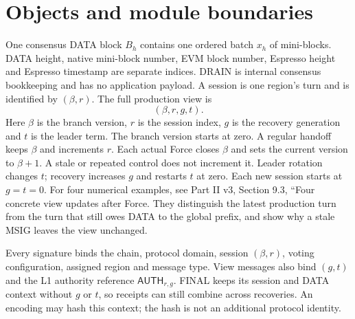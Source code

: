 \documentclass[11pt,a4paper]{article}
\newcommand{\api}[1]{\ensuremath{\mathsf{#1}}}
\begin{document}
\section{Objects and module boundaries}\label{sec:objects}
One consensus DATA block $B_h$ contains one ordered batch $x_h$ of
mini-blocks. DATA height, native mini-block number, EVM block number,
Espresso height and Espresso timestamp are separate indices. DRAIN is
internal consensus bookkeeping and has no application payload.
A session is one region's turn and is identified by $(\beta,r)$.
The full production view is
\[
 (\beta,r,g,t).
\]
Here $\beta$ is the branch version, $r$ is the session index, $g$ is
the recovery generation and $t$ is the leader term. The branch version
starts at zero. A regular handoff keeps $\beta$ and increments $r$.
Each actual Force closes $\beta$ and sets the current version to
$\beta+1$. A stale or repeated control does not increment it. Leader rotation
changes $t$; recovery increases $g$ and restarts $t$ at zero. Each new
session starts at $g=t=0$.
For four numerical examples, see Part II v3,
Section 9.3, ``Four concrete view updates after Force.
They distinguish the latest production turn from the turn that still
owes DATA to the global prefix, and show why a stale MSIG leaves the
view unchanged.

Every signature binds the chain, protocol domain, session $(\beta,r)$,
voting configuration, assigned region and message type. View messages
also bind $(g,t)$ and the L1 authority reference $\api{AUTH}_{r,g}$.
FINAL keeps its session and DATA context without $g$ or $t$, so receipts
can still combine across recoveries. An encoding may hash this context;
the hash is not an additional protocol identity.
\end{document}
